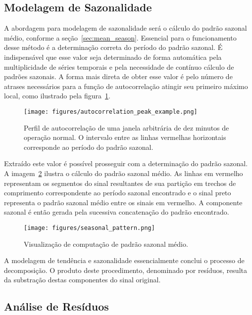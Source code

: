 \subsection{Modelagem de Sazonalidade}

A abordagem para modelagem de sazonalidade será o cálculo do padrão sazonal
médio, conforme a seção~\ref{sec:mean_season}. Essencial para o funcionamento
desse método é a determinação correta do período do padrão sazonal. É
indispensável que esse valor seja determinado de forma automática pela
multiplicidade de séries temporais e pela necessidade de contínuo cálculo de
padrões sazonais. A forma mais direta de obter esse valor é pelo número de
atrases necessários para a função de autocorrelação atingir seu primeiro
máximo local, como ilustrado pela figura~\ref{fig:acorr_peak}.

\begin{figure}[H]
    \centering
    \texttt{[image: figures/autocorrelation\_peak\_example.png]}
    \caption{Perfil de autocorrelação de uma janela arbitrária de dez minutos
    de operação normal. O intervalo entre as linhas vermelhas horizontais
    corresponde ao período do padrão sazonal.}
    \label{fig:acorr_peak}
\end{figure}

Extraído este valor é possível prosseguir com a determinação do padrão sazonal.
A imagem~\ref{fig:mean_seasonal_pattern} ilustra o cálculo do padrão sazonal
médio. As linhas em vermelho representam os segmentos do sinal resultantes de
sua partição em trechos de comprimento correspondente ao período sazonal
encontrado e o sinal preto representa o padrão sazonal médio entre os sinais em
vermelho. A componente sazonal é então gerada pela sucessiva concatenação do
padrão encontrado.

\begin{figure}[H]
    \centering
    \texttt{[image: figures/seasonal\_pattern.png]}
    \caption{Visualização de computação de padrão sazonal médio.}
    \label{fig:mean_seasonal_pattern}
\end{figure}

A modelagem de tendência e sazonalidade essencialmente conclui o processo de
decomposição. O produto deste procedimento, denominado por resíduos, resulta da
substração destas componentes do sinal original.

\subsection{Análise de Resíduos}

